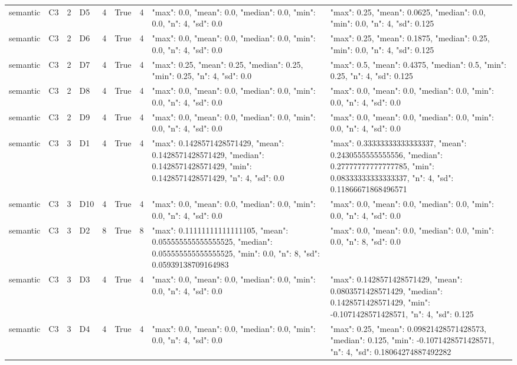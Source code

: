 \begin{tabular}{lllllllll}
semantic & C3 & 2 & D5 & 4 & True & 4 & {"max": 0.0, "mean": 0.0, "median": 0.0, "min": 0.0, "n": 4, "sd": 0.0} & {"max": 0.25, "mean": 0.0625, "median": 0.0, "min": 0.0, "n": 4, "sd": 0.125} \\
semantic & C3 & 2 & D6 & 4 & True & 4 & {"max": 0.0, "mean": 0.0, "median": 0.0, "min": 0.0, "n": 4, "sd": 0.0} & {"max": 0.25, "mean": 0.1875, "median": 0.25, "min": 0.0, "n": 4, "sd": 0.125} \\
semantic & C3 & 2 & D7 & 4 & True & 4 & {"max": 0.25, "mean": 0.25, "median": 0.25, "min": 0.25, "n": 4, "sd": 0.0} & {"max": 0.5, "mean": 0.4375, "median": 0.5, "min": 0.25, "n": 4, "sd": 0.125} \\
semantic & C3 & 2 & D8 & 4 & True & 4 & {"max": 0.0, "mean": 0.0, "median": 0.0, "min": 0.0, "n": 4, "sd": 0.0} & {"max": 0.0, "mean": 0.0, "median": 0.0, "min": 0.0, "n": 4, "sd": 0.0} \\
semantic & C3 & 2 & D9 & 4 & True & 4 & {"max": 0.0, "mean": 0.0, "median": 0.0, "min": 0.0, "n": 4, "sd": 0.0} & {"max": 0.0, "mean": 0.0, "median": 0.0, "min": 0.0, "n": 4, "sd": 0.0} \\
semantic & C3 & 3 & D1 & 4 & True & 4 & {"max": 0.1428571428571429, "mean": 0.1428571428571429, "median": 0.1428571428571429, "min": 0.1428571428571429, "n": 4, "sd": 0.0} & {"max": 0.33333333333333337, "mean": 0.2430555555555556, "median": 0.27777777777777785, "min": 0.08333333333333337, "n": 4, "sd": 0.11866671868496571} \\
semantic & C3 & 3 & D10 & 4 & True & 4 & {"max": 0.0, "mean": 0.0, "median": 0.0, "min": 0.0, "n": 4, "sd": 0.0} & {"max": 0.0, "mean": 0.0, "median": 0.0, "min": 0.0, "n": 4, "sd": 0.0} \\
semantic & C3 & 3 & D2 & 8 & True & 8 & {"max": 0.11111111111111105, "mean": 0.055555555555555525, "median": 0.055555555555555525, "min": 0.0, "n": 8, "sd": 0.05939138709164983} & {"max": 0.0, "mean": 0.0, "median": 0.0, "min": 0.0, "n": 8, "sd": 0.0} \\
semantic & C3 & 3 & D3 & 4 & True & 4 & {"max": 0.0, "mean": 0.0, "median": 0.0, "min": 0.0, "n": 4, "sd": 0.0} & {"max": 0.1428571428571429, "mean": 0.0803571428571429, "median": 0.1428571428571429, "min": -0.1071428571428571, "n": 4, "sd": 0.125} \\
semantic & C3 & 3 & D4 & 4 & True & 4 & {"max": 0.0, "mean": 0.0, "median": 0.0, "min": 0.0, "n": 4, "sd": 0.0} & {"max": 0.25, "mean": 0.09821428571428573, "median": 0.125, "min": -0.1071428571428571, "n": 4, "sd": 0.18064274887492282} \\

\end{tabular}
